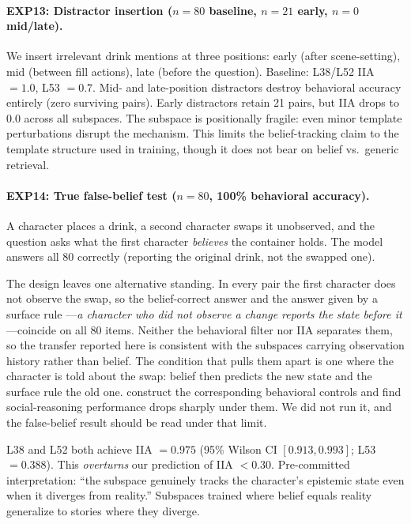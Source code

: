 \documentclass{article}
\begin{document}
\paragraph{EXP13: Distractor insertion ($n = 80$ baseline, $n = 21$ early, $n = 0$ mid/late).}
We insert irrelevant drink mentions at three positions: early (after scene-setting), mid (between fill actions), late (before the question). Baseline: L38/L52 IIA $= 1.0$, L53 $= 0.7$. Mid- and late-position distractors destroy behavioral accuracy entirely (zero surviving pairs). Early distractors retain 21 pairs, but IIA drops to $0.0$ across all subspaces. The subspace is positionally fragile: even minor template perturbations disrupt the mechanism. This limits the belief-tracking claim to the template structure used in training, though it does not bear on belief vs.\ generic retrieval.

\paragraph{EXP14: True false-belief test ($n = 80$, 100\% behavioral accuracy).}
A character places a drink, a second character swaps it unobserved, and the question asks what the first character \emph{believes} the container holds. The model answers all 80 correctly (reporting the original drink, not the swapped one).

The design leaves one alternative standing. In every pair the first character does not
observe the swap, so the belief-correct answer and the answer given by a surface rule
---\emph{a character who did not observe a change reports the state before it}---coincide on
all 80 items. Neither the behavioral filter nor IIA separates them, so the transfer reported
here is consistent with the subspaces carrying observation history rather than belief. The
condition that pulls them apart is one where the character is told about the swap:
belief then predicts the new state and the surface rule the old one. \citet{shapira2024clever}
construct the corresponding behavioral controls and find social-reasoning performance drops
sharply under them. We did not run it, and the false-belief result should be read under that
limit.

L38 and L52 both achieve IIA $= 0.975$ (95\% Wilson CI $[0.913, 0.993]$; L53 $= 0.388$). This \emph{overturns} our prediction of IIA $< 0.30$. Pre-committed interpretation: ``the subspace genuinely tracks the character's epistemic state even when it diverges from reality.'' Subspaces trained where belief equals reality generalize to stories where they diverge.
\end{document}
